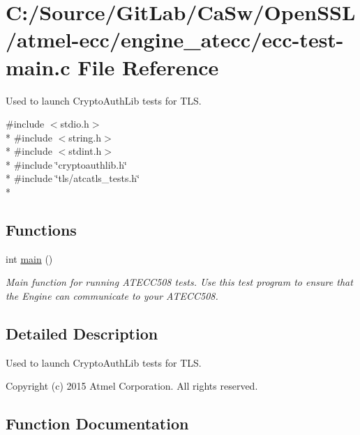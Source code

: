 \hypertarget{ecc-test-main_8c}{}\section{C\+:/\+Source/\+Git\+Lab/\+Ca\+Sw/\+Open\+S\+S\+L/atmel-\/ecc/engine\+\_\+atecc/ecc-\/test-\/main.c File Reference}
\label{ecc-test-main_8c}


Used to launch Crypto\+Auth\+Lib tests for T\+L\+S.  


{\ttfamily \#include $<$stdio.\+h$>$}\\*
{\ttfamily \#include $<$string.\+h$>$}\\*
{\ttfamily \#include $<$stdint.\+h$>$}\\*
{\ttfamily \#include \char`\"{}cryptoauthlib.\+h\char`\"{}}\\*
{\ttfamily \#include \char`\"{}tls/atcatls\+\_\+tests.\+h\char`\"{}}\\*
\subsection*{Functions}
\begin{DoxyCompactItemize}
\item 
int \hyperlink{ecc-test-main_8c_ae66f6b31b5ad750f1fe042a706a4e3d4}{main} ()
\begin{DoxyCompactList}\small\item\em Main function for running A\+T\+E\+C\+C508 tests. Use this test program to ensure that the Engine can communicate to your A\+T\+E\+C\+C508. \end{DoxyCompactList}\end{DoxyCompactItemize}


\subsection{Detailed Description}
Used to launch Crypto\+Auth\+Lib tests for T\+L\+S. 

Copyright (c) 2015 Atmel Corporation. All rights reserved.

\subsection{Function Documentation}
\hypertarget{ecc-test-main_8c_ae66f6b31b5ad750f1fe042a706a4e3d4}{}

